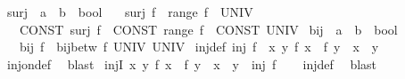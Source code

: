 \begin{isabellebody}
\ surj\ {\isacharcolon}{\kern0pt}{\isacharcolon}{\kern0pt}\ {\isachardoublequoteopen}{\isacharparenleft}{\kern0pt}{\isacharprime}{\kern0pt}a\ {\isasymRightarrow}\ {\isacharprime}{\kern0pt}b{\isacharparenright}{\kern0pt}\ {\isasymRightarrow}\ bool{\isachardoublequoteclose}\isanewline
\ \ \ {\isachardoublequoteopen}surj\ f\ {\isasymequiv}\ range\ f\ {\isacharequal}{\kern0pt}\ UNIV{\isachardoublequoteclose}\isanewline
\isanewline
{}\isamarkupfalse%
\ %
\isanewline
\ \ {\isachardoublequoteopen}{\isasymnot}\ CONST\ surj\ f{\isachardoublequoteclose}\ {\isasymleftharpoondown}\ {\isachardoublequoteopen}CONST\ range\ f\ {\isasymnoteq}\ CONST\ UNIV{\isachardoublequoteclose}\isanewline
\isanewline
{}\isamarkupfalse%
\ bij\ {\isacharcolon}{\kern0pt}{\isacharcolon}{\kern0pt}\ {\isachardoublequoteopen}{\isacharparenleft}{\kern0pt}{\isacharprime}{\kern0pt}a\ {\isasymRightarrow}\ {\isacharprime}{\kern0pt}b{\isacharparenright}{\kern0pt}\ {\isasymRightarrow}\ bool{\isachardoublequoteclose}\isanewline
\ \ \ {\isachardoublequoteopen}bij\ f\ {\isasymequiv}\ bij{\isacharunderscore}{\kern0pt}betw\ f\ UNIV\ UNIV{\isachardoublequoteclose}\isanewline
\isanewline
{}\isamarkupfalse%
\ inj{\isacharunderscore}{\kern0pt}def{\isacharcolon}{\kern0pt}\ {\isachardoublequoteopen}inj\ f\ {\isasymlongleftrightarrow}\ {\isacharparenleft}{\kern0pt}{\isasymforall}x\ y{\isachardot}{\kern0pt}\ f\ x\ {\isacharequal}{\kern0pt}\ f\ y\ {\isasymlongrightarrow}\ x\ {\isacharequal}{\kern0pt}\ y{\isacharparenright}{\kern0pt}{\isachardoublequoteclose}\isanewline
%
\isadelimproof
\ \ %
\endisadelimproof
%
\isatagproof
{}\isamarkupfalse%
\ inj{\isacharunderscore}{\kern0pt}on{\isacharunderscore}{\kern0pt}def\ \isamarkupfalse%
\ blast%
\endisatagproof
{\isafoldproof}%
%
\isadelimproof
\isanewline
%
\endisadelimproof
\isanewline
{}\isamarkupfalse%
\ injI{\isacharcolon}{\kern0pt}\ {\isachardoublequoteopen}{\isacharparenleft}{\kern0pt}{\isasymAnd}x\ y{\isachardot}{\kern0pt}\ f\ x\ {\isacharequal}{\kern0pt}\ f\ y\ {\isasymLongrightarrow}\ x\ {\isacharequal}{\kern0pt}\ y{\isacharparenright}{\kern0pt}\ {\isasymLongrightarrow}\ inj\ f{\isachardoublequoteclose}\isanewline
%
\isadelimproof
\ \ %
\endisadelimproof
%
\isatagproof
{}\isamarkupfalse%
\ inj{\isacharunderscore}{\kern0pt}def\ \isamarkupfalse%
\ blast%
\endisatagproof
{\isafoldproof}%
%
\isadelimproof
\isanewline
%
\endisadelimproof
\isanewline

\end{isabellebody}
